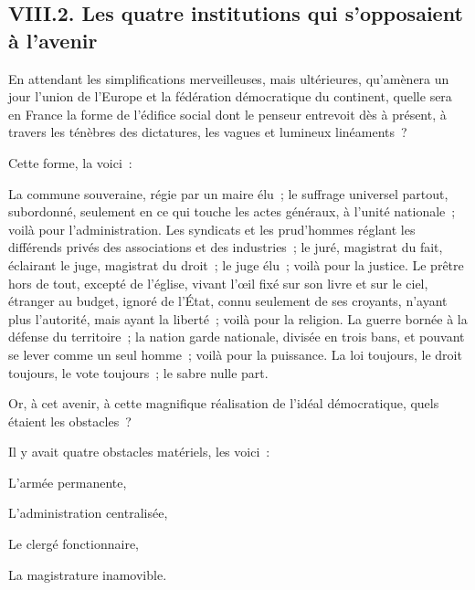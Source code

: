\documentclass[french,twoside]{book} %
\begin{document}
\subsection[{VIII.2. Les quatre institutions qui s’opposaient à l’avenir}]{VIII.2. Les quatre institutions qui s’opposaient à l’avenir}
\noindent En attendant les simplifications merveilleuses, mais ultérieures, qu’amènera un jour l’union de l’Europe et la fédération démocratique du continent, quelle sera en France la forme de l’édifice social dont le penseur entrevoit dès à présent, à travers les ténèbres des dictatures, les vagues et lumineux linéaments ?\par
Cette forme, la voici :\par
La commune souveraine, régie par un maire élu ; le suffrage universel partout, subordonné, seulement en ce qui touche les actes généraux, à l’unité nationale ; voilà pour l’administration. Les syndicats et les prud’hommes réglant les différends privés des associations et des industries ; le juré, magistrat du fait, éclairant le juge, magistrat du droit ; le juge élu ; voilà pour la justice. Le prêtre hors de tout, excepté de l’église, vivant l’œil fixé sur son livre et sur le ciel, étranger au budget, ignoré de l’État, connu seulement de ses croyants, n’ayant plus l’autorité, mais ayant la liberté ; voilà pour la religion. La guerre bornée à la défense du territoire ; la nation garde nationale, divisée en trois bans, et pouvant se lever comme un seul homme ; voilà pour la puissance. La loi toujours, le droit toujours, le vote toujours ; le sabre nulle part.\par
Or, à cet avenir, à cette magnifique réalisation de l’idéal démocratique, quels étaient les obstacles ?\par
Il y avait quatre obstacles matériels, les voici :\par
L’armée permanente,\par
L’administration centralisée,\par
Le clergé fonctionnaire,\par
La magistrature inamovible.
\end{document}
